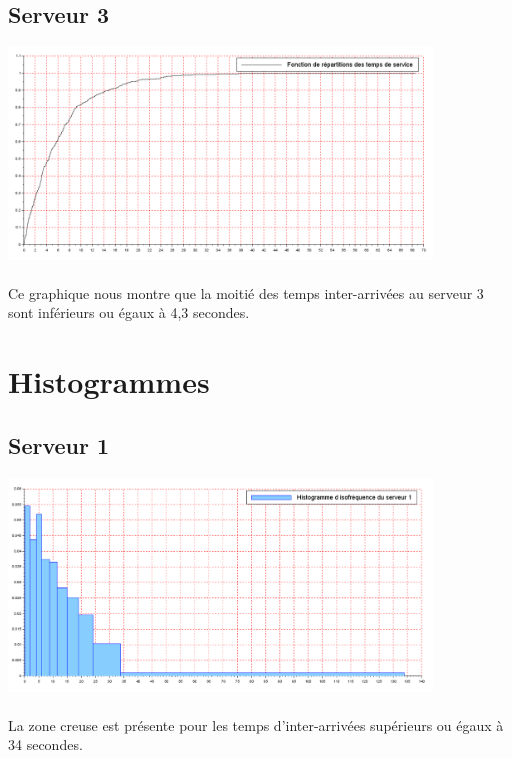 \documentclass{article}
\begin{document}
\subsection{Serveur 3}
\begin{center}
\includegraphics[width=425px]{img/S3_repart.png}
\end{center}
\paragraph{}
Ce graphique nous montre que la moitié des temps inter-arrivées au serveur 3 sont inférieurs ou égaux à 4,3 secondes.

\section{Histogrammes}

\subsection{Serveur 1}
\begin{center}
\includegraphics[width=425px]{img/S1_histo.png}
\end{center}
\paragraph{}
La zone creuse est présente pour les temps d’inter-arrivées supérieurs ou égaux à 34 secondes.
\end{document}
